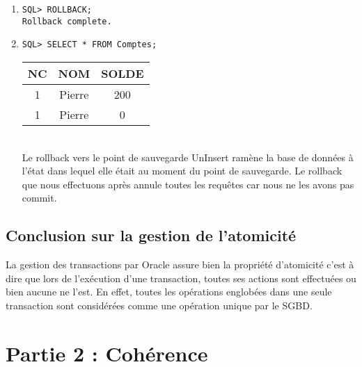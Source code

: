 \documentclass{article}
\begin{document}
\begin{enumerate}[label=\arabic*)]
	\item
		\begin{lstlisting}
SQL> ROLLBACK;
Rollback complete.
		\end{lstlisting}

	\item
		\begin{lstlisting}
SQL> SELECT * FROM Comptes;
		\end{lstlisting}

\begin{tabular}{|c|c|c|}
	\hline
        	NC & NOM & SOLDE \\
	\hline        
 	1 & Pierre & 200 \\
	\hline         
	1 & Pierre & 0 \\
	\hline
\end{tabular} \\

Le rollback vers le point de sauvegarde UnInsert ramène la base de données à l'état dans lequel elle était au moment du point de sauvegarde. Le rollback que nous effectuons après annule toutes les requêtes car nous ne les avons pas commit.
\end{enumerate}

\subsection*{Conclusion sur la gestion de l'atomicité}
La gestion des transactions par Oracle assure bien la propriété d'atomicité c'est à dire que lors de l'exécution d'une transaction, toutes ses actions sont effectuées ou bien aucune ne l'est.
En effet, toutes les opérations englobées dans une seule transaction sont considérées comme une opération unique par le SGBD.

\section*{Partie 2 : Cohérence}
\end{document}
